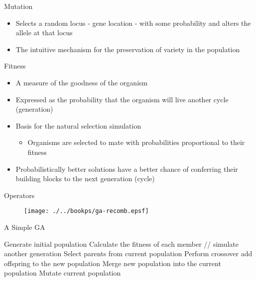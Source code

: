 \documentclass[%
pdf,
colorBG,
slideColor,
tcrico,
]{prosper}
\begin{document}

\begin{slide}{ Mutation}  
\begin{itemize}
\item Selects a random locus - gene location - with some probability and alters the allele at that locus
\item The intuitive mechanism for the preservation of variety in the population
\end{itemize}

\end{slide}


\begin{slide}{ Fitness}
\begin{itemize}
\item A measure of the goodness of the organism
\item Expressed as the probability that the organism will live another cycle (generation)
\item Basis for the natural selection simulation
\begin{itemize}
\item Organisms are selected to mate with probabilities proportional to their fitness
\end{itemize}
\item Probabilistically better solutions have a better chance of conferring their building blocks to the next generation (cycle)
\end{itemize}
\end{slide}



\begin{slide}{  Operators } 
\begin{figure}
	\centering
	\texttt{[image: ./../bookps/ga-recomb.epsf]}
\end{figure}
\end{slide}


\begin{slide}{ A Simple GA}

\begin{algorithm}[H]
Generate initial population \;
{
	Calculate the fitness of each member \;
		// simulate another generation \;
		{
			Select parents from current population \;
			Perform crossover add offspring to the new population \;
		}
	Merge new population into the current population \;
	Mutate current population \;
}
\end{algorithm}



\end{slide}
\end{document}
